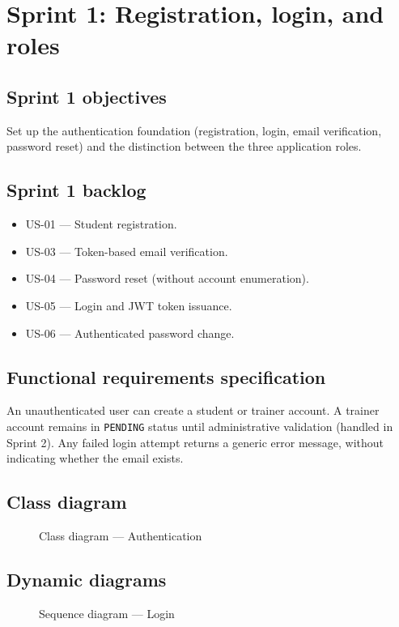 \documentclass[a4paper,12pt]{report}
\begin{document}
\section{Sprint 1: Registration, login, and roles}

\subsection{Sprint 1 objectives}
Set up the authentication foundation (registration, login, email
verification, password reset) and the distinction between the three
application roles.

\subsection{Sprint 1 backlog}
\begin{itemize}[leftmargin=*]
  \item US-01 --- Student registration.
  \item US-03 --- Token-based email verification.
  \item US-04 --- Password reset (without account enumeration).
  \item US-05 --- Login and JWT token issuance.
  \item US-06 --- Authenticated password change.
\end{itemize}

\subsection{Functional requirements specification}
An unauthenticated user can create a student or trainer account. A trainer
account remains in \texttt{PENDING} status until administrative validation
(handled in Sprint 2). Any failed login attempt returns a generic error
message, without indicating whether the email exists.

\subsection{Class diagram}
\begin{figure}[H]
\centering
\caption{Class diagram --- Authentication}
\end{figure}

\subsection{Dynamic diagrams}
\begin{figure}[H]
\centering
\caption{Sequence diagram --- Login}
\end{figure}
\end{document}
